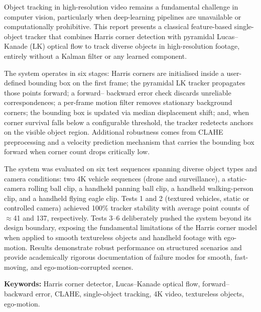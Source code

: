 \documentclass[12pt,a4paper]{article}
\begin{document}
\begin{mdframed}[
  linecolor=accentteal,
  linewidth=0.8pt,
  roundcorner=5pt,
  innertopmargin=12pt,
  innerbottommargin=12pt,
  innerleftmargin=14pt,
  innerrightmargin=14pt,
  backgroundcolor=accentteal!6,
  skipabove=0pt,
  skipbelow=0pt,
]
\noindent
Object tracking in high-resolution video remains a fundamental challenge in computer vision,
particularly when deep-learning pipelines are unavailable or computationally prohibitive.
This report presents a classical feature-based single-object tracker that combines Harris
corner detection with pyramidal Lucas--Kanade (LK) optical flow to track diverse objects in
high-resolution footage, entirely without a Kalman filter or any learned component.

The system operates in six stages: Harris corners are initialised inside a user-defined bounding
box on the first frame; the pyramidal LK tracker propagates those points forward; a forward--
backward error check discards unreliable correspondences; a per-frame motion filter removes
stationary background corners; the bounding box is updated via median displacement shift; and,
when corner survival falls below a configurable threshold, the tracker redetects anchors on the
visible object region. Additional robustness comes from CLAHE preprocessing and a velocity
prediction mechanism that carries the bounding box forward when corner count drops critically
low.

The system was evaluated on six test sequences spanning diverse object types and camera
conditions: two 4K vehicle sequences (drone and surveillance), a static-camera rolling ball clip,
a handheld panning ball clip, a handheld walking-person clip, and a handheld flying eagle clip.
Tests 1 and 2 (textured vehicles, static or controlled camera) achieved 100\% tracker stability
with average point counts of $\approx$41 and 137, respectively. Tests 3--6 deliberately pushed the
system beyond its design boundary, exposing the fundamental limitations of the Harris corner
model when applied to smooth textureless objects and handheld footage with ego-motion.
Results demonstrate robust performance on structured scenarios and provide academically
rigorous documentation of failure modes for smooth, fast-moving, and ego-motion-corrupted
scenes.

\medskip
\textbf{Keywords:} Harris corner detector, Lucas--Kanade optical flow, forward--backward error,
CLAHE, single-object tracking, 4K video, textureless objects, ego-motion.
\end{mdframed}
\end{document}
